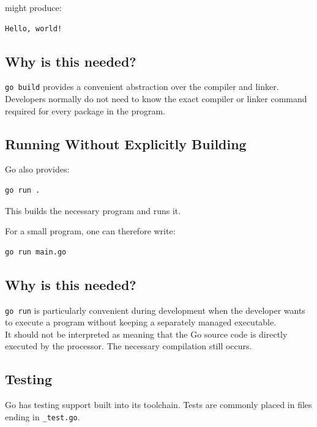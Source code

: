 might produce:

\begin{lstlisting}
Hello, world!
\end{lstlisting}

\subsection*{Why is this needed?}

\texttt{go build} provides a convenient abstraction over the compiler
and linker.  Developers normally do not need to know the exact compiler
or linker command required for every package in the program.

\subsection{Running Without Explicitly Building}

Go also provides:

\begin{lstlisting}
go run .
\end{lstlisting}

This builds the necessary program and runs it.

For a small program, one can therefore write:

\begin{lstlisting}
go run main.go
\end{lstlisting}

\subsection*{Why is this needed?}

\texttt{go run} is particularly convenient during development when the
developer wants to execute a program without keeping a separately
managed executable.\\

It should not be interpreted as meaning that the Go source code is directly
executed by the processor.  The necessary compilation still occurs.

\subsection{Testing}

Go has testing support built into its toolchain.  Tests are commonly
placed in files ending in \texttt{\_test.go}.\\

